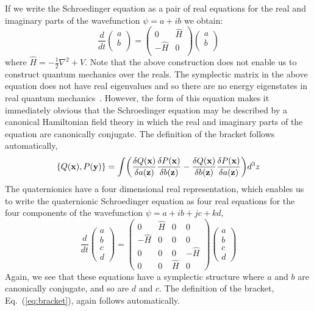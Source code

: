 \documentclass[a4paper,aps,prd,preprint,groupedaddress]{revtex4}
\begin{document}
If we write the Schroedinger equation as a pair of real equations for the real and imaginary parts of the wavefunction $\psi = a+ib$ we obtain:
\begin{equation}
\frac{d}{dt} \begin{pmatrix}
a\\
b\\
\end{pmatrix}
= \begin{pmatrix}
0 & \hat H\\
- \hat H & 0\\
\end{pmatrix}
\begin{pmatrix}
a\\
b\\
\end{pmatrix}
\end{equation}
where $\hat H = -\frac{1}{2}\nabla^2 + V$. Note that the above construction does not enable us to construct quantum mechanics over the reals. The symplectic matrix in the above equation does not have real eigenvalues and so there are no energy eigenstates in real quantum mechanics~\cite{bib:adlerbook}. However, the form of this equation makes it immediately obvious that the Schroedinger equation may be described by a canonical Hamiltonian field theory in which the real and imaginary parts of the equation are canonically conjugate.  The definition of the bracket follows automatically,
\begin{equation}
\begin{split}
\{Q({\bf x}),P({\bf y})\} &=\int\biggl(\frac{\delta Q({\bf x})}{\delta a({\bf z})}\frac{\delta P({\bf x})}{\delta b({\bf z})}-\frac{\delta Q({\bf x})}{\delta b({\bf z})}\frac{\delta P({\bf x})}{\delta a({\bf z})}\biggr)d^3z\\
\end{split}
\end{equation}
The quaternionics have a four dimensional real representation, which enables us to write the quaternionic Schroedinger equation as four real equations for the four components of the wavefunction $\psi=a+ib+jc+kd$,
\begin{equation}
\frac{d}{dt} \begin{pmatrix}
a\\
b\\
c\\
d 
\end{pmatrix}
=  \begin{pmatrix}
0 & \hat H & 0 & 0 \\
-\hat H & 0 & 0 & 0\\
0 & 0 & 0 & -\hat H\\
0 & 0 & \hat H & 0
\end{pmatrix}
\begin{pmatrix}
a\\
b\\
c\\
d 
\end{pmatrix}
\end{equation}
Again, we see that these equations have a symplectic structure where $a$ and $b$ are canonically conjugate, and so are $d$ and $c$. The definition of the bracket, Eq.~(\ref{eq:bracket}), again follows automatically.
\end{document}
